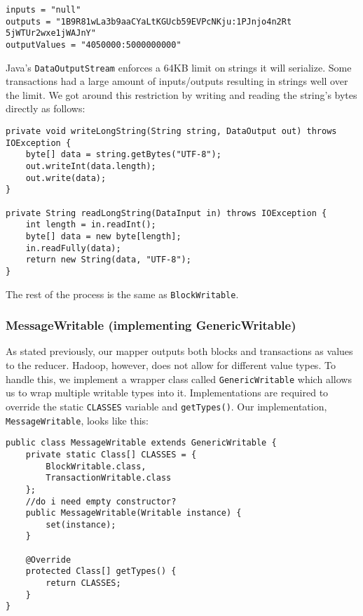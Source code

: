 \documentclass[9pt,twocolumn,twoside]{idsi}
\begin{document}
\begin{lstlisting}
inputs = "null"
outputs = "1B9R81wLa3b9aaCYaLtKGUcb59EVPcNKju:1PJnjo4n2Rt
5jWTUr2wxe1jWAJnY"
outputValues = "4050000:5000000000"
\end{lstlisting}

Java's \lstinline{DataOutputStream} enforces a 64KB limit on strings it will serialize. Some transactions had a large amount of inputs/outputs resulting in strings well over the limit. We got around this restriction by writing and reading the string's bytes directly as follows:

\begin{lstlisting}
private void writeLongString(String string, DataOutput out) throws IOException {
    byte[] data = string.getBytes("UTF-8");
    out.writeInt(data.length);
    out.write(data);
}

private String readLongString(DataInput in) throws IOException {
    int length = in.readInt();
    byte[] data = new byte[length];
    in.readFully(data);
    return new String(data, "UTF-8");
}
\end{lstlisting}

The rest of the process is the same as \lstinline{BlockWritable}.

\subsubsection{MessageWritable (implementing GenericWritable)}

As stated previously, our mapper outputs both blocks and transactions as values to the reducer. Hadoop, however, does not allow for different value types. To handle this, we implement a wrapper class called \lstinline{GenericWritable} which allows us to wrap multiple writable types into it. Implementations are required to override the static \lstinline{CLASSES} variable and \lstinline{getTypes()}. Our implementation, \lstinline{MessageWritable}, looks like this:

\begin{lstlisting}
public class MessageWritable extends GenericWritable {
    private static Class[] CLASSES = {
        BlockWritable.class,
        TransactionWritable.class
    };
    //do i need empty constructor?
    public MessageWritable(Writable instance) {
        set(instance);
    }

    @Override
    protected Class[] getTypes() {
        return CLASSES;
    }
}
\end{lstlisting}
\end{document}
